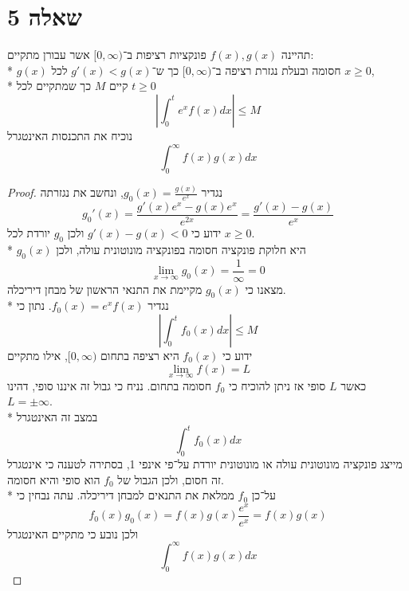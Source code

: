 \section{שאלה 5}
תהיינה $f(x), g(x)$ פונקציות רציפות ב־$[0, \infty)$ אשר עבורן מתקיים: \\* %
$g(x)$ חסומה ובעלת נגזרת רציפה ב־$[0, \infty)$ כך ש־$g'(x) < g(x)$ לכל $x \ge 0$, \\* %
קיים $M$ כך שמתקיים לכל $t \ge 0$
\[
	\left\lvert \int_0^t e^x f(x) dx \right\rvert \le M
\]
נוכיח את התכנסות האינטגרל
\[
	\int_0^\infty f(x) g(x) dx
\]
\begin{proof}
	נגדיר $g_0(x) = \frac{g(x)}{e^x}$, ונחשב את נגזרתה
	\[
		g_0'(x) = \frac{g'(x) e^x - g(x) e^x}{e^{2x}} = \frac{g'(x) - g(x)}{e^x}
	\]
	ידוע כי $g'(x) - g(x) < 0$ ולכן $g_0$ יורדת לכל $x \ge 0$. \\*
	$g_0(x)$ היא חלוקת פונקציה חסומה בפונקציה מונוטונית עולה, ולכן
	\[
		\lim_{x \to \infty} g_0(x) = \frac{1}{\infty} = 0
	\]
	מצאנו כי $g_0(x)$ מקיימת את התנאי הראשון של מבחן דיריכלה. \\*
	נגדיר $f_0(x) = e^x f(x)$. נתון כי
	\[
		\left\lvert \int_0^t f_0(x) dx \right\rvert \le M
	\]
	ידוע כי $f_0(x)$ היא רציפה בתחום $[0, \infty)$, אילו מתקיים %
	\[
		\lim_{x \to \infty} f(x) = L
	\]
	כאשר $L$ סופי אז ניתן להוכיח כי $f_0$ חסומה בתחום. נניח כי גבול זה איננו סופי, דהינו $L = \pm \infty$. \\*
	במצב זה האינטגרל
	\[
		\int_0^t f_0(x) dx
	\]
	מייצג פונקציה מונוטונית עולה או מונוטונית יורדת על־פי אינפי 1, בסתירה לטענה כי אינטגרל זה חסום, ולכן הגבול של $f_0$ הוא סופי והיא חסומה. \\*
	על־כן $f_0$ ממלאת את התנאים למבחן דיריכלה. עתה נבחין כי
	\[
		f_0(x) g_0(x) = f(x) g(x) \frac{e^x}{e^x} = f(x) g(x)
	\]
	ולכן נובע כי מתקיים האינטגרל
	\[
		\int_0^\infty f(x) g(x) dx
	\]
\end{proof}

